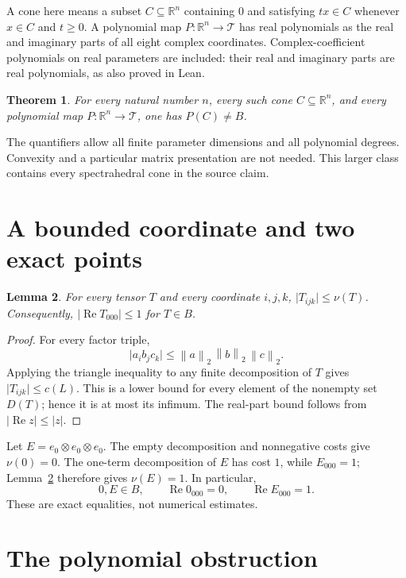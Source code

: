 \documentclass[11pt]{article}
\newtheorem{theorem}{Theorem}
\newtheorem{lemma}[theorem]{Lemma}
\newcommand{\R}{\mathbb R}
\newcommand{\nn}[1]{\left\lVert #1\right\rVert_2}
\begin{document}
A cone here means a subset \(C\subseteq\R^n\) containing \(0\) and satisfying
\(tx\in C\) whenever \(x\in C\) and \(t\geq0\).
A polynomial map \(P:\R^n\to\mathcal T\) has real polynomials as the real
and imaginary parts of all eight complex coordinates.
Complex-coefficient polynomials on real parameters are included: their
real and imaginary parts are real polynomials, as also proved in Lean.

\begin{theorem}\label{thm:main}
For every natural number \(n\), every such cone \(C\subseteq\R^n\), and
every polynomial map \(P:\R^n\to\mathcal T\), one has \(P(C)\neq B\).
\end{theorem}

The quantifiers allow all finite parameter dimensions and all polynomial
degrees. Convexity and a particular matrix presentation are not needed.
This larger class contains every spectrahedral cone in the source claim.

\section{A bounded coordinate and two exact points}

\begin{lemma}\label{lem:bound}
For every tensor \(T\) and every coordinate \(i,j,k\),
\(\lvert T_{ijk}\rvert\leq\nu(T)\).
Consequently, \(\lvert\operatorname{Re}T_{000}\rvert\leq1\) for \(T\in B\).
\end{lemma}
\begin{proof}
For every factor triple,
\[
 \lvert a_i b_j c_k\rvert
 \leq \nn a\,\nn b\,\nn c.
\]
Applying the triangle inequality to any finite decomposition of \(T\)
gives \(\lvert T_{ijk}\rvert\leq c(L)\).
This is a lower bound for every element of the nonempty set \(D(T)\);
hence it is at most its infimum. The real-part bound follows from
\(\lvert\operatorname{Re}z\rvert\leq\lvert z\rvert\).
\end{proof}

Let \(E=e_0\otimes e_0\otimes e_0\).
The empty decomposition and nonnegative costs give \(\nu(0)=0\).
The one-term decomposition of \(E\) has cost \(1\), while
\(E_{000}=1\); Lemma~\ref{lem:bound} therefore gives \(\nu(E)=1\).
In particular,
\[
 0,E\in B,\qquad \operatorname{Re}0_{000}=0,\qquad
 \operatorname{Re}E_{000}=1.
\]
These are exact equalities, not numerical estimates.

\section{The polynomial obstruction}
\end{document}
